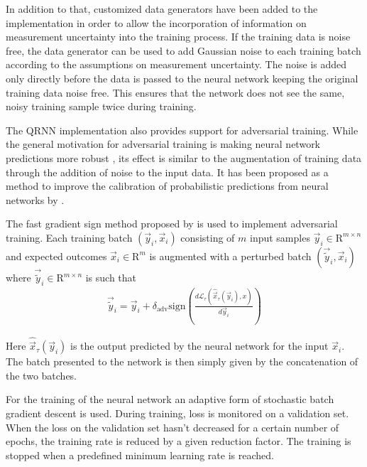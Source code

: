 \documentclass[journal abbreviation, manuscript]{copernicus}
\begin{document}
    In addition to that, customized data generators have been added to the
    implementation in order to allow the incorporation of information on
    measurement uncertainty into the training process. If the training data is
    noise free, the data generator can be used to add Gaussian noise to each
    training batch according to the assumptions on measurement uncertainty. The
    noise is added only directly before the data is passed to the neural network
    keeping the original training data noise free. This ensures that the network
    does not see the same, noisy training sample twice during training.

    The QRNN implementation also provides support for adversarial training.
    While the general motivation for adversarial training is making neural
    network predictions more robust \citep{goodfellow_2}, its effect is similar
    to the augmentation of training data through the addition of noise to the
    input data. It has been proposed as a method to improve the calibration of
    probabilistic predictions from neural networks by \cite{lakshminarayanan}.

    The fast gradient sign method proposed by \citet{goodfellow_2} is used
    to implement adversarial training. Each training batch $(\vec{y}_i, \vec{x}_i)$
    consisting of $m$ input samples $\vec{y}_i \in \mathrm{R}^{m \times n}$ and
    expected outcomes $\vec{x}_i \in \mathrm{R}^m$ is augmented with a perturbed
    batch $(\vec{\tilde{y}}_i, \vec{x}_i)$ where $\vec{\tilde{y}}_i \in
    \mathrm{R}^{m \times n}$ is such that
    \begin{align}
      \vec{\tilde{y}}_i = \vec{y}_i + \delta_\text{adv} \text{sign} \left (
      \frac{d \mathcal{L}_\tau(\hat{\vec{x}}_\tau(\vec{y}_i), x)}{d\vec{y}_i} \right
      )
    \end{align}

    Here $\hat{\vec{x}}_\tau(\vec{y}_i)$ is the output predicted by the neural
    network for the input $\vec{x}_i$. The batch presented to the network is
    then simply given by the concatenation of the two batches.

   For the training of the neural network an adaptive form of stochastic batch
   gradient descent is used. During training, loss is monitored on a validation
   set. When the loss on the validation set hasn't decreased for a certain number
   of epochs, the training rate is reduced by a given reduction factor. The
   training is stopped when a predefined minimum learning rate is reached.
\end{document}
